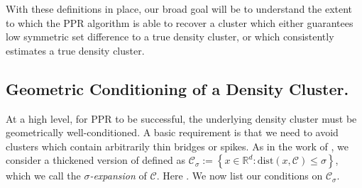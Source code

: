 \documentclass{article}
\newcommand{\Reals}{\mathbb{R}}
\newcommand{\set}[1]{\left\{#1\right\}}
\newcommand{\1}{\mathbf{1}}
\newcommand{\Cset}{\mathcal{C}}
\newcommand{\Csig}{\Cset_{\sigma}}
\newcommand{\Cbb}{\mathbb{C}}
\newcommand{\dist}{\mathrm{dist}}
\theoremstyle{alden}
\theoremstyle{aldenthm}
\theoremstyle{definition}
\theoremstyle{remark}
\begin{document}
With these definitions in place, our broad goal will be to understand the extent to which the PPR algorithm is able to
recover a cluster which either guarantees low symmetric set difference to a true density cluster, or which consistently estimates
a true density cluster.

\subsection{Geometric Conditioning of a Density Cluster.}%
At a high level, for PPR
to be successful, the underlying density cluster must be geometrically
well-conditioned.  A basic requirement is that we need to avoid clusters which contain arbitrarily
thin bridges or spikes. As in the work of \citet{chaudhuri2010}, we consider a
thickened version of \smash{$\Cset \in \Cbb_f(\lambda)$} defined as 
$\Csig := \set{x \in \Reals^d: \dist(x,\Cset) \leq \sigma}$, which 
we call the \emph{$\sigma$-expansion} of $\Cset$. Here 
\smash{$\dist(x,\Cset) := \inf_{y \in \Cset} \norm{y - x}$}.  We now list our
conditions on $\Csig$.
\end{document}
